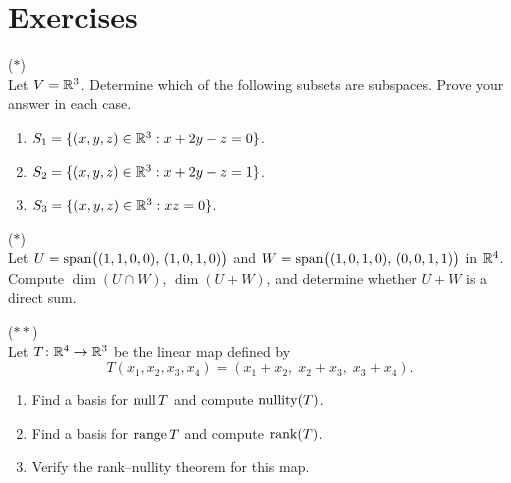 \documentclass[11pt,a4paper]{article}
\begin{document}
\section{Exercises}
\label{sec:exercises}

\begin{exercise}
\label{ex:subspace_verify}
\textnormal{(\(*\))} \\
Let $V = \mathbb{R}^3$.  Determine which of the following subsets are subspaces.
Prove your answer in each case.
\begin{enumerate}[nosep,label=(\alph*)]
  \item $S_1 = \{(x,y,z) \in \mathbb{R}^3 : x + 2y - z = 0\}$.
  \item $S_2 = \{(x,y,z) \in \mathbb{R}^3 : x + 2y - z = 1\}$.
  \item $S_3 = \{(x,y,z) \in \mathbb{R}^3 : xz = 0\}$.
\end{enumerate}
\end{exercise}

\begin{exercise}
\label{ex:dim_sum}
\textnormal{(\(*\))} \\
Let $U = \operatorname{span}\bigl((1,1,0,0),\, (1,0,1,0)\bigr)$ and
$W = \operatorname{span}\bigl((1,0,1,0),\, (0,0,1,1)\bigr)$ in $\mathbb{R}^4$.
Compute $\dim(U \cap W)$, $\dim(U + W)$, and determine whether
$U + W$ is a direct sum.
\end{exercise}

\begin{exercise}
\label{ex:rank_nullity_app}
\textnormal{(\(**\))} \\
Let $T\colon \mathbb{R}^4 \to \mathbb{R}^3$ be the linear map defined by
\[
  T(x_1, x_2, x_3, x_4) = (x_1 + x_2,\; x_2 + x_3,\; x_3 + x_4).
\]
\begin{enumerate}[nosep,label=(\alph*)]
  \item Find a basis for $\operatorname{null} T$ and compute $\operatorname{nullity}(T)$.
  \item Find a basis for $\operatorname{range} T$ and compute $\operatorname{rank}(T)$.
  \item Verify the rank--nullity theorem for this map.
\end{enumerate}
\end{exercise}
\end{document}

